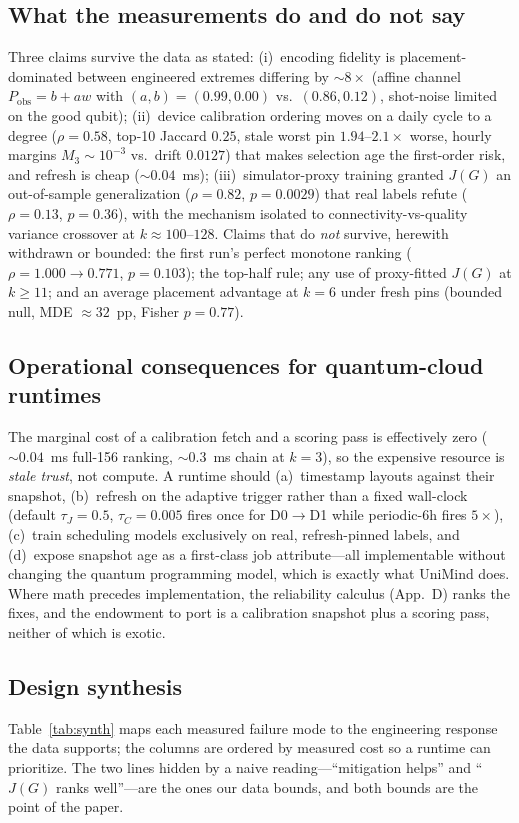 \documentclass[journal,10pt,twocolumn]{IEEEtran}
\begin{document}
\subsection{What the measurements do and do not say}
Three claims survive the data as stated: (i)~encoding fidelity is placement-dominated between engineered extremes
differing by $\sim8\times$ (affine channel $P_{\mathrm{obs}}=b+a w$ with $(a,b)=(0.99,0.00)$ vs.\ $(0.86,0.12)$,
shot-noise limited on the good qubit); (ii)~device calibration ordering moves on a daily cycle to a degree
($\rho{=}0.58$, top-10 Jaccard $0.25$, stale worst pin $1.94$--$2.1\times$ worse, hourly margins
$M_3\sim10^{-3}$ vs.\ drift $0.0127$) that makes selection age the first-order risk, and refresh is cheap
($\sim0.04$~ms); (iii)~simulator-proxy training granted $J(G)$ an out-of-sample generalization
($\rho{=}0.82$, $p{=}0.0029$) that real labels refute ($\rho{=}0.13$, $p{=}0.36$), with the mechanism isolated
to connectivity-vs-quality variance crossover at $k\approx100$--$128$. Claims that do \emph{not} survive,
herewith withdrawn or bounded: the first run's perfect monotone ranking ($\rho{=}1.000\to0.771$, $p{=}0.103$);
the top-half rule; any use of proxy-fitted $J(G)$ at $k\ge11$; and an average placement advantage at $k{=}6$
under fresh pins (bounded null, MDE $\approx32$~pp, Fisher $p{=}0.77$).

\subsection{Operational consequences for quantum-cloud runtimes}
The marginal cost of a calibration fetch and a scoring pass is effectively zero ($\sim0.04$~ms full-156 ranking,
$\sim0.3$~ms chain at $k{=}3$), so the expensive resource is \emph{stale trust}, not compute. A runtime should
(a)~timestamp layouts against their snapshot, (b)~refresh on the adaptive trigger rather than a fixed wall-clock
(default $\tau_J{=}0.5$, $\tau_C{=}0.005$ fires once for D0$\to$D1 while periodic-$6$h fires $5\times$),
(c)~train scheduling models exclusively on real, refresh-pinned labels, and (d)~expose snapshot age as a
first-class job attribute---all implementable without changing the quantum programming model, which is exactly
what UniMind does. Where math precedes implementation, the reliability calculus (App.~D) ranks the
fixes, and the endowment to port is a calibration snapshot plus a scoring pass, neither of which is exotic.

\subsection{Design synthesis}
Table~\ref{tab:synth} maps each measured failure mode to the engineering response the data supports; the columns
are ordered by measured cost so a runtime can prioritize. The two lines hidden by a naive reading---``mitigation
helps'' and ``$J(G)$ ranks well''---are the ones our data bounds, and both bounds are the point of the paper.
\end{document}
